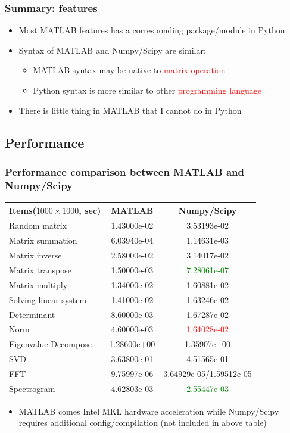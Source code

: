 \documentclass[compress]{beamer}
\begin{document}
\begin{frame}
	\frametitle{Summary: features}
	\begin{itemize}
		\item Most MATLAB features has a corresponding package/module in Python
		\item Syntax of MATLAB and Numpy/Scipy are similar: 
		\begin{itemize}
			\item MATLAB syntax may be native to \textcolor{red}{matrix operation}
			\item Python syntax is more similar to other \textcolor{red}{programming language}
		\end{itemize}
		\item There is little thing in MATLAB that I cannot do in Python
	\end{itemize}
\end{frame}

\subsection{Performance}
\begin{frame}
	\frametitle{Performance comparison between MATLAB and Numpy/Scipy}
	\begin{table}
		\begin{tabular}{|l|c|c|}
			\hline
			Items($1000\times1000$, sec) & MATLAB & Numpy/Scipy\\\hline
			Random matrix			& 	1.43000e-02 	& 	3.53193e-02\\\hline
			Matrix summation		&	6.03940e-04 	&	1.14631e-03\\\hline
			Matrix inverse			&	2.58000e-02		&	3.14017e-02\\\hline
			Matrix transpose		&	1.50000e-03		&	\textcolor{green}{7.28061e-07}\\\hline
			Matrix multiply			&	1.34000e-02		&	1.60881e-02\\\hline
			Solving linear system	&	1.41000e-02		&	1.63246e-02\\\hline
			Determinant				&	8.60000e-03		&	1.67287e-02\\\hline
			Norm						&	4.60000e-03		&	\textcolor{red}{1.64028e-02}\\\hline
			Eigenvalue Decompose	&	1.28600e+00		&	1.35907e+00\\\hline
			SVD						&	3.63800e-01		&	4.51565e-01\\\hline
			FFT						&	9.75997e-06		&	3.64929e-05/1.59512e-05\\\hline
			Spectrogram				&	4.62803e-03		&	\textcolor{green}{2.55447e-03}\\\hline
		\end{tabular}
	\end{table}
	\begin{itemize}
		\tiny
		\item MATLAB comes Intel MKL hardware acceleration while Numpy/Scipy requires additional config/compilation (not included in above table)
	\end{itemize}
\end{frame}
\end{document}
